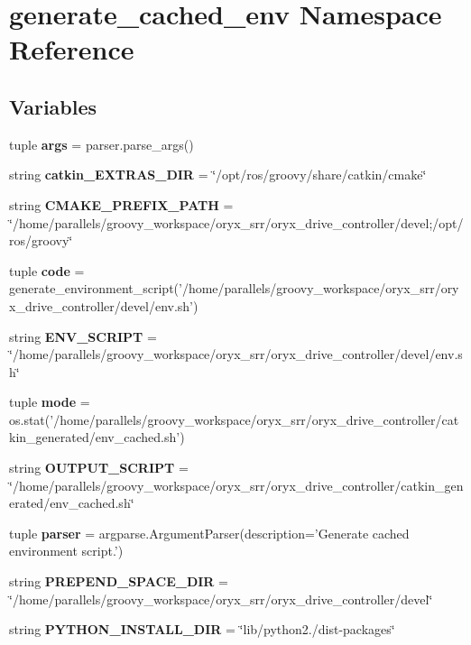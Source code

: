 \section{generate\-\_\-cached\-\_\-env \-Namespace \-Reference}
\label{namespacegenerate__cached__env}
\subsection*{\-Variables}
\begin{DoxyCompactItemize}
\item 
tuple {\bf args} = parser.\-parse\-\_\-args()
\item 
string {\bf catkin\-\_\-\-E\-X\-T\-R\-A\-S\-\_\-\-D\-I\-R} = \char`\"{}/opt/ros/groovy/share/catkin/cmake\char`\"{}
\item 
string {\bf \-C\-M\-A\-K\-E\-\_\-\-P\-R\-E\-F\-I\-X\-\_\-\-P\-A\-T\-H} = \char`\"{}/home/parallels/groovy\-\_\-workspace/oryx\-\_\-srr/oryx\-\_\-drive\-\_\-controller/devel;/opt/ros/groovy\char`\"{}
\item 
tuple {\bf code} = generate\-\_\-environment\-\_\-script('/home/parallels/groovy\-\_\-workspace/oryx\-\_\-srr/oryx\-\_\-drive\-\_\-controller/devel/env.\-sh')
\item 
string {\bf \-E\-N\-V\-\_\-\-S\-C\-R\-I\-P\-T} = \char`\"{}/home/parallels/groovy\-\_\-workspace/oryx\-\_\-srr/oryx\-\_\-drive\-\_\-controller/devel/env.\-sh\char`\"{}
\item 
tuple {\bf mode} = os.\-stat('/home/parallels/groovy\-\_\-workspace/oryx\-\_\-srr/oryx\-\_\-drive\-\_\-controller/catkin\-\_\-generated/env\-\_\-cached.\-sh')
\item 
string {\bf \-O\-U\-T\-P\-U\-T\-\_\-\-S\-C\-R\-I\-P\-T} = \char`\"{}/home/parallels/groovy\-\_\-workspace/oryx\-\_\-srr/oryx\-\_\-drive\-\_\-controller/catkin\-\_\-generated/env\-\_\-cached.\-sh\char`\"{}
\item 
tuple {\bf parser} = argparse.\-Argument\-Parser(description='\-Generate cached environment script.')
\item 
string {\bf \-P\-R\-E\-P\-E\-N\-D\-\_\-\-S\-P\-A\-C\-E\-\_\-\-D\-I\-R} = \char`\"{}/home/parallels/groovy\-\_\-workspace/oryx\-\_\-srr/oryx\-\_\-drive\-\_\-controller/devel\char`\"{}
\item 
string {\bf \-P\-Y\-T\-H\-O\-N\-\_\-\-I\-N\-S\-T\-A\-L\-L\-\_\-\-D\-I\-R} = \char`\"{}lib/python2./dist-\/packages\char`\"{}
\end{DoxyCompactItemize}


